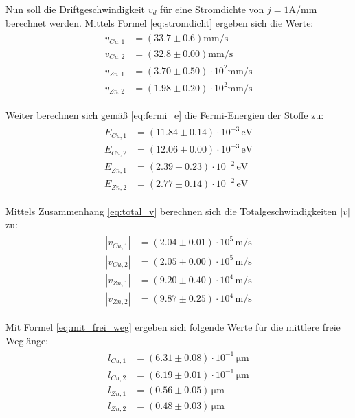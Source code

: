 Nun soll die Driftgeschwindigkeit $v_d$ für eine Stromdichte von $j = 1 \si{\ampere \per \milli \meter}$ berechnet werden. Mittels Formel
\eqref{eq:stromdicht} ergeben sich die Werte:
\begin{align}
\begin{aligned}
v_{Cu,1} &= (33.7 \pm 0.6)   \si{\milli\meter\per\second}  \\%
v_{Cu,2} &= (32.8 \pm 0.00)  \si{\milli\meter\per\second}  \\
v_{Zn,1} &= (3.70 \pm 0.50)\cdot 10^{ 2}   \si{\milli\meter\per\second} \\
v_{Zn,2} &= (1.98 \pm 0.20)\cdot 10^{ 2}   \si{\milli\meter\per\second}
\end{aligned}
\end{align}

Weiter berechnen sich gemäß \eqref{eq:fermi_e} die Fermi-Energien der Stoffe zu: %
\begin{align}
\begin{aligned}
E_{Cu,1} &= (11.84 \pm 0.14)\cdot 10^{-3} \, \si{\eV}  \\%
E_{Cu,2} &= (12.06 \pm 0.00)\cdot 10^{-3} \, \si{\eV}  \\
E_{Zn,1} &= (2.39 \pm 0.23)\cdot 10^{-2}  \,  \si{\eV} \\
E_{Zn,2} &= (2.77 \pm 0.14)\cdot 10^{-2}  \, \si{\eV}
\end{aligned}
\end{align}

Mittels Zusammenhang \eqref{eq:total_v} berechnen sich die Totalgeschwindigkeiten $\left| v \right| $ zu:
\begin{align}
\begin{aligned}
\left|v_{Cu,1}\right| &= (2.04 \pm 0.01)\cdot 10^5 \, \si{\meter \per \second}  \\%
\left|v_{Cu,2}\right| &= (2.05 \pm 0.00)\cdot 10^5 \, \si{\meter \per \second}  \\
\left|v_{Zn,1}\right| &= (9.20 \pm 0.40)\cdot 10^4 \, \si{\meter \per \second}  \\
\left|v_{Zn,2}\right| &= (9.87 \pm 0.25)\cdot 10^4 \, \si{\meter \per \second}
\end{aligned}
\end{align}

Mit Formel \eqref{eq:mit_frei_weg} ergeben sich folgende Werte für die mittlere freie Weglänge:
\begin{align}
\begin{aligned}
l_{Cu,1} &= (6.31 \pm 0.08)\cdot 10^{-1} \, \si{\micro\meter}  \\%
l_{Cu,2} &= (6.19 \pm 0.01)\cdot 10^{-1} \, \si{\micro\meter}  \\
l_{Zn,1} &= (0.56 \pm 0.05) \, \si{\micro\meter}  \\
l_{Zn,2} &= (0.48 \pm 0.03) \, \si{\micro\meter}
\end{aligned}
\end{align}

